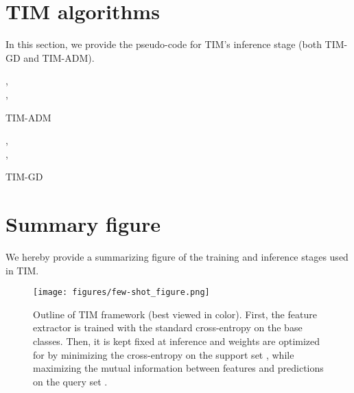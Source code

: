 \documentclass{article}
\begin{document}
\section{TIM algorithms}\label{sec:algorithms}
    
    In this section, we provide the pseudo-code for TIM's inference stage (both TIM-GD and TIM-ADM).
        \begin{algorithm}
            \SetAlgoLined
             \vspace{0.5em}
             ,  \\
             ,  \\
            \For{ \KwTo }{
                 ,  \\
                 \\ 
                 , \\
                 \\
      	        
                
            }
            \caption{TIM-ADM}
            \end{algorithm}
            \begin{algorithm}
            \SetAlgoLined
             \vspace{0.5em}
             ,  \\
             ,  \\
            \For{ \KwTo }{
                 \\
                 \\ 
      	        
                
            }
            \caption{TIM-GD}
            \end{algorithm}

\section{Summary figure}    
            	    
    We hereby provide a summarizing figure of the training and inference stages used in TIM.
	\begin{figure}[H]
        \centering
        \texttt{[image: figures/few-shot\_figure.png]}
        \caption{Outline of TIM framework (best viewed in color). First, the feature extractor is trained with the standard cross-entropy on the base classes. Then, it is kept fixed at inference and weights  are optimized for by minimizing the cross-entropy on the support set , while maximizing the mutual information between features and predictions on the query set .}
        \label{fig:pipeline}
    \end{figure}
\end{document}
